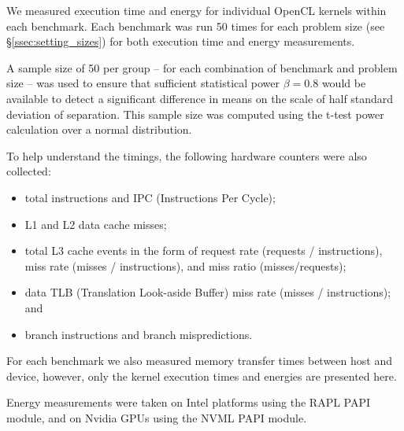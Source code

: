 \documentclass[../document.tex]{subfiles}
\begin{document}
\label{ssec:measurements}


We measured execution time and energy for individual OpenCL kernels within each benchmark.
Each benchmark was run 50 times for each problem size (see \S\ref{ssec:setting_sizes}) for both execution time and energy measurements.

A sample size of 50 per group -- for each combination of benchmark and problem size -- was used to ensure that sufficient statistical power $\beta = 0.8$ would be available to detect a significant difference in means on the scale of half standard deviation of separation.
This sample size was computed using the t-test power calculation over a normal distribution.

To help understand the timings, the following hardware counters were also collected:
\begin{itemize}
	\item total instructions and IPC (Instructions Per Cycle);
	\item L1 and L2 data cache misses;
	\item total L3 cache events in the form of request rate (requests / instructions), miss rate (misses / instructions), and miss ratio (misses/requests);
	\item data TLB (Translation Look-aside Buffer) miss rate (misses / instructions); and
	\item branch instructions and branch mispredictions.
\end{itemize}
For each benchmark we also measured memory transfer times between host and device, however, only the kernel execution times and energies are presented here.

Energy measurements were taken on Intel platforms using the RAPL PAPI module, and on Nvidia GPUs using the NVML PAPI module.
\end{document}
